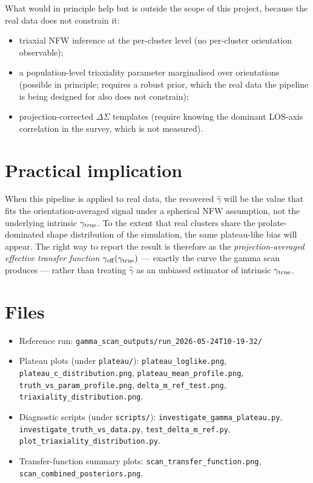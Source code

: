 \documentclass[11pt,a4paper]{article}
\newcommand{\gtrue}{\gamma_{\rm true}}
\newcommand{\ghat}{\hat\gamma}
\begin{document}
What would in principle help but is outside the scope of this project, because
the real data does not constrain it:

\begin{itemize}
  \item triaxial NFW inference at the per-cluster level (no per-cluster
        orientation observable);
  \item a population-level triaxiality parameter marginalised over orientations
        (possible in principle; requires a robust prior, which the real data
        the pipeline is being designed for also does not constrain);
  \item projection-corrected $\Delta\Sigma$ templates (require knowing the
        dominant LOS-axis correlation in the survey, which is not measured).
\end{itemize}

\section{Practical implication}

When this pipeline is applied to real data, the recovered $\ghat$ will be the
value that fits the orientation-averaged signal under a spherical NFW
assumption, not the underlying intrinsic $\gtrue$.  To the extent that real
clusters share the prolate-dominated shape distribution of the simulation, the
same plateau-like bias will appear.  The right way to report the result is
therefore as the \emph{projection-averaged effective transfer function}
$\gamma_{\rm eff}(\gtrue)$ --- exactly the curve the gamma scan produces ---
rather than treating $\ghat$ as an unbiased estimator of intrinsic $\gtrue$.

\section*{Files}

\begin{itemize}
  \item Reference run: \texttt{gamma\_scan\_outputs/run\_2026-05-24T10-19-32/}
  \item Plateau plots (under \texttt{plateau/}):
    \texttt{plateau\_loglike.png},
    \texttt{plateau\_c\_distribution.png},
    \texttt{plateau\_mean\_profile.png},
    \texttt{truth\_vs\_param\_profile.png},
    \texttt{delta\_m\_ref\_test.png},
    \texttt{triaxiality\_distribution.png}.
  \item Diagnostic scripts (under \texttt{scripts/}):
    \texttt{investigate\_gamma\_plateau.py},
    \texttt{investigate\_truth\_vs\_data.py},
    \texttt{test\_delta\_m\_ref.py},
    \texttt{plot\_triaxiality\_distribution.py}.
  \item Transfer-function summary plots:
    \texttt{scan\_transfer\_function.png},
    \texttt{scan\_combined\_posteriors.png}.
\end{itemize}
\end{document}
